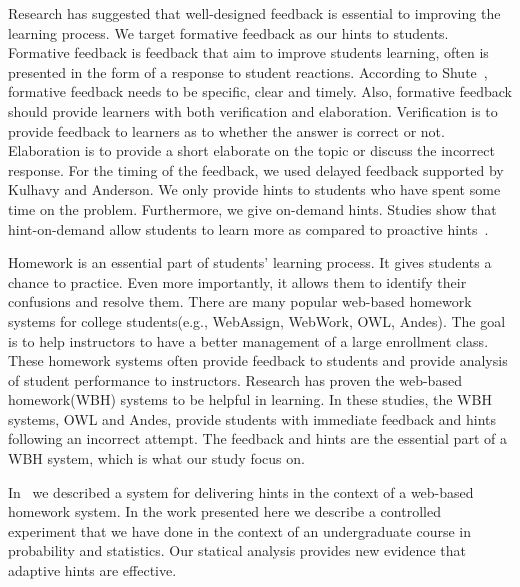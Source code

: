 \documentclass{llncs}
\begin{document}
Research has suggested that well-designed feedback is essential to improving the learning process\cite{Azevedo1995}\cite{Bangert-Drowns1991}. We target formative feedback as our hints to students. Formative feedback is feedback that aim to improve students learning, often is presented in the form of a response to student reactions\cite{Shute2008}. According to Shute~\cite{Shute2008}, formative feedback needs to be specific, clear and timely. Also, formative feedback should provide learners with both verification and elaboration\cite{Mason2001}\cite{Bangert-Drowns1991}. Verification is to provide feedback to learners as to whether the answer is correct or not. Elaboration is to provide a short elaborate on the topic or discuss the incorrect response. For the timing of the feedback, we used delayed feedback supported by Kulhavy and Anderson\cite{Kulhavy1972}. We only provide hints to students who have spent some time on the problem. Furthermore, we give on-demand hints. Studies show that hint-on-demand allow students to learn more as compared to proactive hints~\cite{Razzaq2010}.

Homework is an essential part of students' learning process\cite{Cooper2006}. It gives students a chance to practice. Even more importantly, it allows them to identify their confusions and resolve them. There are many popular web-based homework systems for college students(e.g., WebAssign, WebWork, OWL, Andes). The goal is to help instructors to have a better management of a large enrollment class. These homework systems often provide feedback to students and provide analysis of student performance to instructors. Research has proven the web-based homework(WBH) systems to be helpful in learning\cite{MestHartRath2002}\cite{Vanlehn2005}. In these studies, the WBH systems, OWL and Andes, provide students with immediate feedback and hints following an incorrect attempt\cite{MestHartRath2002}\cite{Vanlehn2005}. The feedback and hints are the essential part of a WBH system, which is what our study focus on.

In~\cite{ElkherjFreund14} we described a system for delivering hints in the context of a web-based homework system.  In the work presented here we describe a controlled experiment that we have done in the context of an undergraduate course in probability and statistics. Our statical analysis provides new evidence that adaptive hints are effective.
\end{document}
